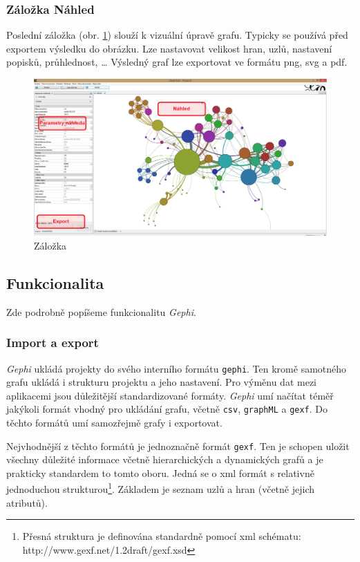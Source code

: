 \documentclass[thesis=M,czech]{FITthesis}[2014/05/6]
\begin{document}
\subsubsection{Záložka Náhled}
Poslední záložka (obr. \ref{fig:gephi-exp}) slouží k vizuální úpravě grafu. Typicky se používá před exportem výsledku do obrázku. Lze nastavovat velikost hran, uzlů, nastavení popisků, průhlednost, \ldots
Výsledný graf lze exportovat ve formátu png, svg a pdf.

\begin{figure}\centering
 	\includegraphics[width=1\textwidth]{images/gephi/gephi_exp_final}
 	\caption[Záložka ]{Záložka }\label{fig:gephi-exp}
\end{figure}

\subsection{Funkcionalita}
Zde podrobně popíšeme funkcionalitu \textit{Gephi}.

\subsubsection{Import a export}
\textit{Gephi} ukládá projekty do svého interního formátu \texttt{gephi}. Ten kromě samotného grafu ukládá i strukturu projektu a jeho nastavení. Pro výměnu dat mezi
aplikacemi jsou důležitější standardizované formáty. \textit{Gephi} umí načítat téměř jakýkoli formát vhodný pro ukládání grafu, včetně \texttt{csv}, \texttt{graphML} a
\texttt{gexf}. Do těchto formátů umí samozřejmě grafy i exportovat.

Nejvhodnější z těchto formátů je jednoznačně formát \texttt{gexf}\cite{gexf}. Ten je schopen uložit všechny důležité informace včetně hierarchických a dynamických grafů a je
prakticky standardem to tomto oboru. Jedná se o xml formát s relativně jednoduchou strukturou\footnote{Přesná struktura je definována standardně pomocí xml schématu: http://www.gexf.net/1.2draft/gexf.xsd}. Základem je seznam uzlů a hran (včetně jejich atributů).
\end{document}
